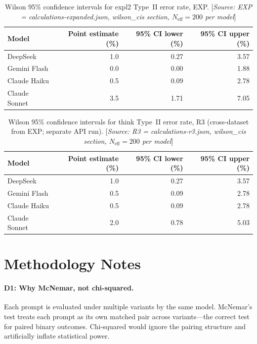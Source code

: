 \documentclass[11pt,a4paper]{article}
\begin{document}
\begin{table}[htbp]
\centering
\caption{Wilson 95\% confidence intervals for \textsf{expl2} Type~II error
  rate, EXP.
  [\emph{Source: EXP = calculations-expanded.json, wilson\_cis section,
  $N_\text{eff} = 200$ per model}]}
\label{tab:c1}
\smallskip
\begin{tabular}{@{}lrrr@{}}
\toprule
Model & Point estimate (\%) & 95\% CI lower (\%) & 95\% CI upper (\%) \\
\midrule
DeepSeek      & 1.0  & 0.27 & 3.57 \\
Gemini Flash  & 0.0  & 0.00 & 1.88 \\
Claude Haiku  & 0.5  & 0.09 & 2.78 \\
Claude Sonnet & 3.5  & 1.71 & 7.05 \\
\bottomrule
\end{tabular}
\end{table}

\begin{table}[htbp]
\centering
\caption{Wilson 95\% confidence intervals for \textsf{think} Type~II error
  rate, R3 (cross-dataset from EXP; separate API run).
  [\emph{Source: R3 = calculations-r3.json, wilson\_cis section,
  $N_\text{eff} = 200$ per model}]}
\label{tab:c2}
\smallskip
\begin{tabular}{@{}lrrr@{}}
\toprule
Model & Point estimate (\%) & 95\% CI lower (\%) & 95\% CI upper (\%) \\
\midrule
DeepSeek       & 1.0 & 0.27 & 3.57 \\
Gemini Flash   & 0.5 & 0.09 & 2.78 \\
Claude Haiku   & 0.5 & 0.09 & 2.78 \\
Claude Sonnet  & 2.0 & 0.78 & 5.03 \\
\bottomrule
\end{tabular}
\end{table}

\section{Methodology Notes}
\label{app:methods}

\paragraph{D1: Why McNemar, not chi-squared.}
Each prompt is evaluated under multiple variants by the same model.
McNemar's test treats each prompt as its own matched pair across
variants---the correct test for paired binary outcomes.
Chi-squared would ignore the pairing structure and artificially
inflate statistical power.
\end{document}
